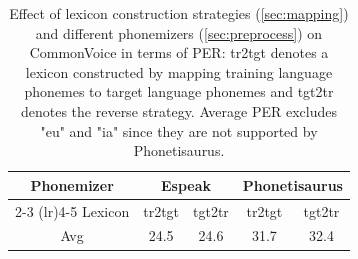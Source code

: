 \begin{table}[t]
\caption{Effect of lexicon construction strategies (\textsection\ref{sec:mapping}) and different phonemizers (\textsection\ref{sec:preprocess}) on CommonVoice in terms of PER: tr2tgt denotes a lexicon constructed by mapping training language phonemes to target language phonemes and tgt2tr denotes the reverse strategy. 
Average PER excludes "eu" and "ia" since they are not supported by Phonetisaurus. \label{tab:cv_res_abl2}}
\begin{center}
\begin{tabular}{@{}ccccc@{}}
\toprule
 Phonemizer  & \multicolumn{2}{c}{Espeak}  & \multicolumn{2}{c}{Phonetisaurus}  \\
 \cmidrule(lr){2-3} \cmidrule(lr){4-5}
  Lexicon & tr2tgt      & tgt2tr     & tr2tgt      & tgt2tr   \\
\midrule
Avg & 24.5&	24.6&31.7&	32.4
\\
\bottomrule
\end{tabular}
\end{center}
\end{table}